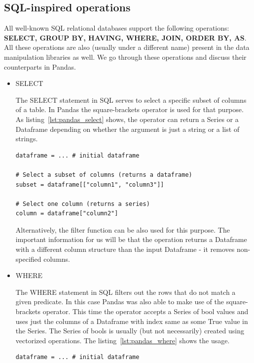 \subsection{SQL-inspired operations}

All well-known SQL relational databases support the following operations:
\textbf{SELECT, GROUP BY, HAVING, WHERE, JOIN, ORDER BY, AS}.
All these operations are also (usually under a different name) present in the data manipulation libraries as well.
We go through these operations and discuss their counterparts in Pandas.

\begin{itemize}
    \item SELECT

    The SELECT statement in SQL serves to select a specific subset of columns of a table.
    In Pandas the square-brackets operator is used for that purpose.
    As listing~\ref{lst:pandas_select} shows, the operator can return a Series or a Dataframe depending on whether
    the argument is just a string or a list of strings.
    \begin{lstlisting}[caption=Select in Pandas, label={lst:pandas_select}, captionpos=b]
dataframe = ... # initial dataframe

# Select a subset of columns (returns a dataframe)
subset = dataframe[["column1", "column3"]]

# Select one column (returns a series)
column = dataframe["column2"]
    \end{lstlisting}
    Alternatively, the filter function can be also used for this purpose.
    The important information for us will be that the operation returns a Dataframe with a different column structure
    than the input Dataframe - it removes non-specified columns.

    \item WHERE

    The WHERE statement in SQL filters out the rows that do not match a given predicate.
    In this case Pandas was also able to make use of the square-brackets operator.
    This time the operator accepts a Series of bool values and uses just the columns of a Dataframe with index same as
    some True value in the Series.
    The Series of bools is usually (but not necessarily) created using vectorized operations.
    The listing~\ref{lst:pandas_where} shows the usage.
    \begin{lstlisting}[caption=Where in Pandas, label={lst:pandas_where}, captionpos=b]
dataframe = ... # initial dataframe


\end{lstlisting}
\end{itemize}
